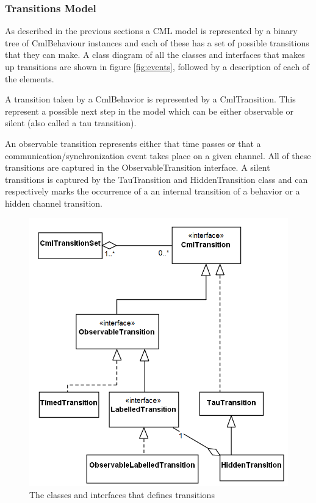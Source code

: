 \documentclass[a4paper, 10pt]{include/compassreport}   %
\begin{document}
\subsubsection{Transitions Model}
\label{sec:transition_model}

As described in the previous sections a CML model is represented by a
binary tree of CmlBehaviour instances and each of these has a set of
possible transitions that they can make. A class diagram of all the
classes and interfaces that makes up transitions are shown in figure
\ref{fig:events}, followed by a description of each of the elements.

A transition taken by a CmlBehavior is represented by a
CmlTransition. This represent a possible next step in the model which
can be either observable or silent (also called a tau transition).

An observable transition represents either that time passes or that a
communication/synchronization event takes place on a given
channel. All of these transitions are captured in the
ObservableTransition interface.  A silent transitions is captured by
the TauTransition and HiddenTransition class and can respectively
marks the occurrence of a an internal transition of a behavior or a
hidden channel transition.

\begin{figure}[ht!]
  \begin{center}
    \includegraphics[width=1\textwidth]{figures/transition-structure}
    \caption{The classes and interfaces that defines transitions}
    \label{fig:transition_structure}
  \end{center}
\end{figure}
\end{document}
